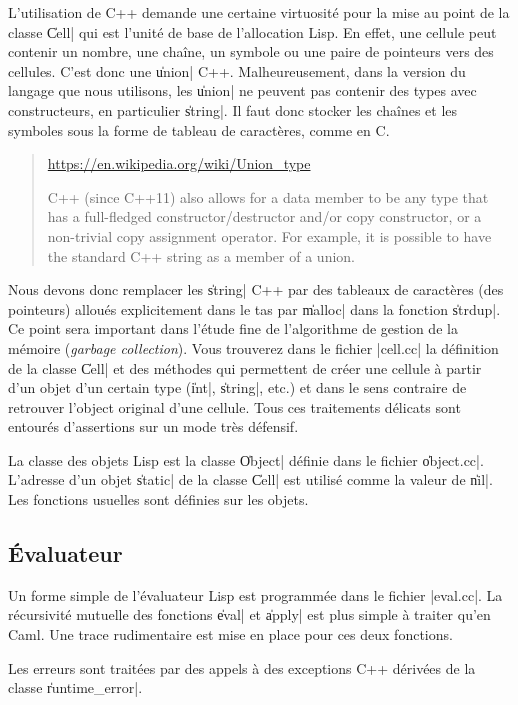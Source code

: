 \documentclass{../../../LaTeX/tdsimple}
\begin{document}
L'utilisation de C++ demande une certaine virtuosité pour la mise au
point de la classe \|Cell| qui est l'unité de base de l'allocation
Lisp. En effet, une cellule peut contenir un nombre, une chaîne, un
symbole ou une paire de pointeurs vers des cellules. C'est donc une
\|union| C++. Malheureusement, dans la version du langage que nous
utilisons, les \|union| ne peuvent pas contenir des types avec
constructeurs, en particulier \|string|. Il faut donc stocker les
chaînes et les symboles sous la forme de tableau de caractères, comme
en C.
\begin{quotation}
  \url{https://en.wikipedia.org/wiki/Union_type}

  C++ (since C++11) also allows for a data member to be any type that
  has a full-fledged constructor/destructor and/or copy constructor,
  or a non-trivial copy assignment operator. For example, it is
  possible to have the standard C++ string as a member of a union.
\end{quotation}

Nous devons donc remplacer les \|string| C++ par des tableaux de
caractères (des pointeurs) alloués explicitement dans le tas par
\|malloc| dans la fonction \|strdup|. Ce point sera important dans
l'étude fine de l'algorithme de gestion de la mémoire (\emph{garbage
  collection}). Vous trouverez dans le fichier \file|cell.cc| la
définition de la classe \|Cell| et des méthodes qui permettent de
créer une cellule à partir d'un objet d'un certain type (\|int|,
\|string|, etc.)  et dans le sens contraire de retrouver l'object
original d'une cellule. Tous ces traitements délicats sont entourés
d'assertions sur un mode très défensif.

La classe des objets Lisp est la classe \|Object| définie dans le
fichier \|object.cc|. L'adresse d'un objet \|static| de la classe \|Cell| est
utilisé comme la valeur de \|nil|. Les fonctions usuelles sont
définies sur les objets. 

\subsection{Évaluateur}

Un forme simple de l'évaluateur Lisp est programmée dans le fichier
\file|eval.cc|.  La récursivité mutuelle des fonctions \|eval| et \|apply|
est plus simple à traiter qu'en Caml. Une trace rudimentaire est mise
en place pour ces deux fonctions.

Les erreurs sont traitées par des appels à des exceptions C++ dérivées
de la classe \|runtime_error|.
\end{document}
